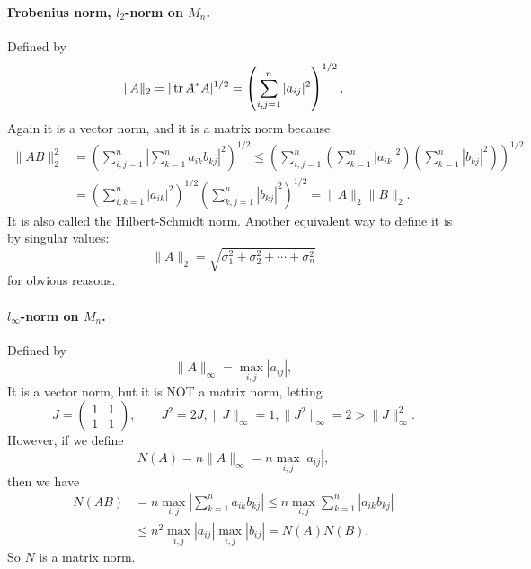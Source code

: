 \documentclass[../main.tex]{subfiles}
\begin{document}
\paragraph{Frobenius norm, $l_2$-norm on $M_n$. } Defined by
\begin{equation*}
  \| A \|_2 = |\operatorname{tr} A^* A|^{1/2} = \left( \sum_{i,j=1}^n |a_{ij}|^2 \right)^{1/2},
\end{equation*}
Again it is a vector norm, and it is a matrix norm because
\begin{equation*}
  \begin{aligned}
    \| AB \|_2^2 & = \left( \sum_{i,j=1}^n \left| \sum_{k=1}^n a_{ik} b_{kj} \right|^2 \right)^{1/2} \leq \left( \sum_{i,j=1}^n \left( \sum_{k=1}^n |a_{ik}|^2 \right) \left( \sum_{k=1}^n |b_{kj}|^2 \right) \right)^{1/2} \\
    & = \left( \sum_{i,k=1}^n |a_{ik}|^2 \right)^{1/2} \left( \sum_{k,j=1}^n |b_{kj}|^2 \right)^{1/2} = \| A \|_2 \| B \|_2.
  \end{aligned}
\end{equation*}
It is also called the Hilbert-Schmidt norm. Another equivalent way to define it is by singular values:
\begin{equation}
  \| A \|_2 = \sqrt{\sigma_1^2 + \sigma_2^2 + \cdots + \sigma_n^2}
\end{equation}
for obvious reasons.

\paragraph{$l_\infty$-norm on $M_n$. } Defined by
\begin{equation*}
  \| A \|_\infty = \max_{i,j} |a_{ij}|,
\end{equation*}
It is a vector norm, but it is NOT a matrix norm, letting
\begin{equation*}
  J = \begin{pmatrix}
    1 & 1 \\
    1 & 1
  \end{pmatrix}, \qquad J^2 = 2J, \|J\|_\infty = 1, \|J^2\|_\infty = 2 > \|J\|_\infty^2.
\end{equation*}
However, if we define
\begin{equation}
  N(A) = n \| A \|_\infty = n \max_{i,j} |a_{ij}|,
\end{equation}
then we have
\begin{equation*}
  \begin{aligned}
    N(AB) & = n \max_{i,j} \left| \sum_{k=1}^n a_{ik} b_{kj} \right| \leq n \max_{i,j} \sum_{k=1}^n |a_{ik} b_{kj}| \\
    & \leq n^2 \max_{i,j} |a_{ij}| \max_{i,j} |b_{ij}| = N(A) N(B).
  \end{aligned}
\end{equation*}
So $N$ is a matrix norm.
\end{document}
